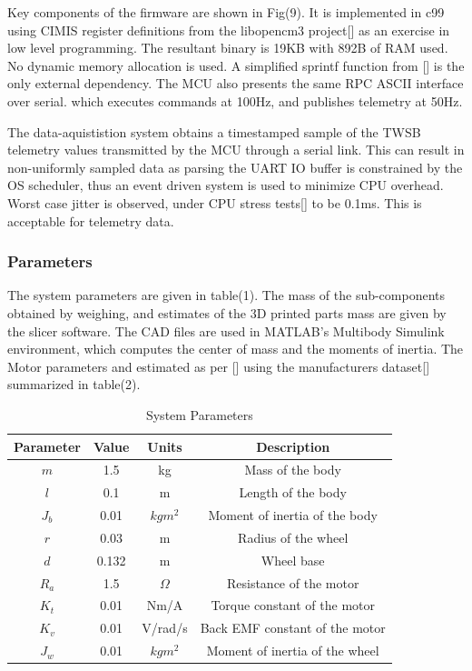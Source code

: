         Key components of the firmware are shown in Fig(9).
        It is implemented in c99 using CIMIS register definitions from the 
        libopencm3 project[] as an exercise in low level programming. 
        The resultant binary is 19KB with 892B of RAM used.
        No dynamic memory allocation is used.
        A simplified sprintf function from [] is the only external dependency.
        The MCU also presents the same RPC ASCII interface over serial.
        which executes commands at 100Hz, and publishes telemetry at 50Hz.

        The data-aquististion system obtains a timestamped sample of the TWSB 
        telemetry values transmitted by the MCU through a serial link.
        This can result in non-uniformly sampled data as parsing the UART IO buffer 
        is constrained by the OS scheduler, thus an event driven system is used to minimize CPU overhead.   
        Worst case jitter is observed, under CPU stress tests[] to be 0.1ms. 
        This is acceptable for telemetry data. 
        \pagebreak{}

    
        \subsubsection{Parameters }
        The system parameters are given in table(1). 
        The mass of the sub-components obtained by weighing,
        and estimates of the 3D printed parts mass are given by the slicer software. 
        The CAD files are used in MATLAB's Multibody Simulink environment, which 
        computes the center of mass and the moments of inertia.
        The Motor parameters and estimated as per [] using the manufacturers dataset[] summarized in table(2).
    
        \begin{table} [H]
            \centering
            \begin{tabular}{|c|c|c|c|}
                \hline
                Parameter & Value & Units & Description \\
                \hline
                $m$ & 1.5 & kg & Mass of the body \\
                $l$ & 0.1 & m & Length of the body \\
                $J_b$ & 0.01 & $kgm^2$ & Moment of inertia of the body \\
                $r$ & 0.03 & m & Radius of the wheel \\
                $d$ & 0.132 & m & Wheel base \\
                $R_a$ & 1.5 & $\Omega$ & Resistance of the motor \\
                $K_t$ & 0.01 & Nm/A & Torque constant of the motor \\
                $K_v$ & 0.01 & V/rad/s & Back EMF constant of the motor \\
                $J_w$ & 0.01 & $kgm^2$ & Moment of inertia of the wheel \\
                \hline
            \end{tabular}
            \caption{System Parameters}
        \end{table}



